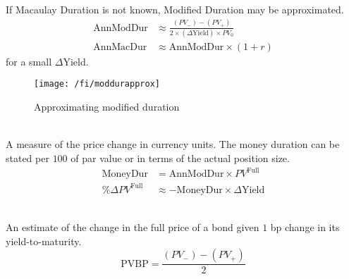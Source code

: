 \begin{remark} \\
If Macaulay Duration is not known, Modified Duration may be approximated.
\begin{align}
\text{AnnModDur} &\approx \frac{(PV_{-}) - (PV_{+})}{2 \times (\Delta \text{Yield}) \times PV_0} \nonumber \\
\text{AnnMacDur} &\approx \text{AnnModDur} \times (1+r) \nonumber
\end{align}
for a small $\Delta$Yield.
\end{remark}

\begin{figure}[H]
\centering
\texttt{[image: /fi/moddurapprox]}
\caption{Approximating modified duration}
\end{figure}

\begin{definition} \\
A measure of the price change in currency units. The money duration can be stated per $100$ of par value or in terms of the actual position size.
\begin{align}
\text{MoneyDur} &= \text{AnnModDur} \times PV^{\text{Full}} \nonumber \\
\%\Delta PV^{\text{Full}} &\approx - \text{MoneyDur} \times \Delta \text{Yield} \nonumber
\end{align}
\end{definition}

\begin{definition} \\
An estimate of the change in the full price of a bond given $1$ bp change in its yield-to-maturity.
\begin{equation}
\text{PVBP} = \frac{(PV_{-}) - (PV_{+})}{2} \nonumber
\end{equation}
\end{definition}

